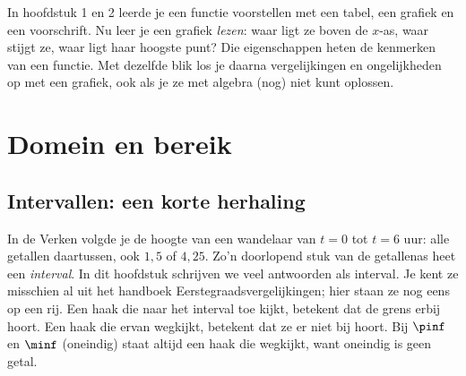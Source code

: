 In hoofdstuk 1 en 2 leerde je een functie voorstellen met een tabel, een grafiek en een voorschrift. Nu leer je een grafiek \textit{lezen}: waar ligt ze boven de $x$-as, waar stijgt ze, waar ligt haar hoogste punt? Die eigenschappen heten de kenmerken van een functie. Met dezelfde blik los je daarna vergelijkingen en ongelijkheden op met een grafiek, ook als je ze met algebra (nog) niet kunt oplossen.

\begin{oefeningen}[Start]

\end{oefeningen}

\section{Domein en bereik}

\subsection{Intervallen: een korte herhaling}

In de Verken volgde je de hoogte van een wandelaar van $t = 0$ tot $t = 6$ uur: alle getallen daartussen, ook $1{,}5$ of $4{,}25$. Zo'n doorlopend stuk van de getallenas heet een \textit{interval}. In dit hoofdstuk schrijven we veel antwoorden als interval. Je kent ze misschien al uit het handboek Eerstegraadsvergelijkingen; hier staan ze nog eens op een rij. Een haak die naar het interval toe kijkt, betekent dat de grens erbij hoort. Een haak die ervan wegkijkt, betekent dat ze er niet bij hoort. Bij $\pinf$ en $\minf$ (oneindig) staat altijd een haak die wegkijkt, want oneindig is geen getal.

